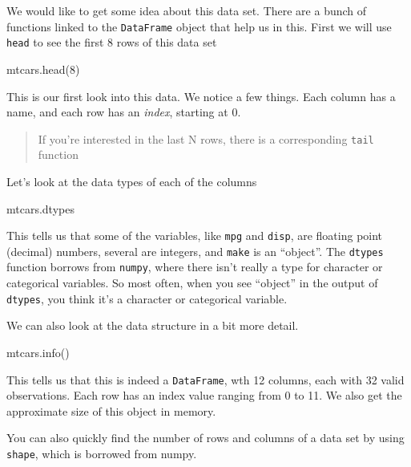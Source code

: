 \documentclass[
  letterpaper,
]{scrbook}
\newenvironment{Shaded}{\begin{snugshade}}{\end{snugshade}}
\newcommand{\DecValTok}[1]{\textcolor[rgb]{0.00,0.00,0.81}{#1}}
\newcommand{\NormalTok}[1]{#1}
\begin{document}
We would like to get some idea about this data set. There are a bunch of functions linked to the \texttt{DataFrame} object that help us in this. First we will use \texttt{head} to see the first 8 rows of this data set

\begin{Shaded}
\begin{Highlighting}[]
\NormalTok{mtcars.head(}\DecValTok{8}\NormalTok{)}
\end{Highlighting}
\end{Shaded}

This is our first look into this data. We notice a few things. Each column has a name, and each row has an \emph{index}, starting at 0.

\begin{quote}
If you're interested in the last N rows, there is a corresponding \texttt{tail} function
\end{quote}

Let's look at the data types of each of the columns

\begin{Shaded}
\begin{Highlighting}[]
\NormalTok{mtcars.dtypes}
\end{Highlighting}
\end{Shaded}

This tells us that some of the variables, like \texttt{mpg} and \texttt{disp}, are floating point (decimal) numbers, several are integers, and \texttt{make} is an ``object''. The \texttt{dtypes} function borrows from \texttt{numpy}, where there isn't really a type for character or categorical variables. So most often, when you see ``object'' in the output of \texttt{dtypes}, you think it's a character or categorical variable.

We can also look at the data structure in a bit more detail.

\begin{Shaded}
\begin{Highlighting}[]
\NormalTok{mtcars.info()}
\end{Highlighting}
\end{Shaded}

This tells us that this is indeed a \texttt{DataFrame}, wth 12 columns, each with 32 valid observations. Each row has an index value ranging from 0 to 11. We also get the approximate size of this object in memory.

You can also quickly find the number of rows and columns of a data set by using \texttt{shape}, which is borrowed from numpy.
\end{document}
